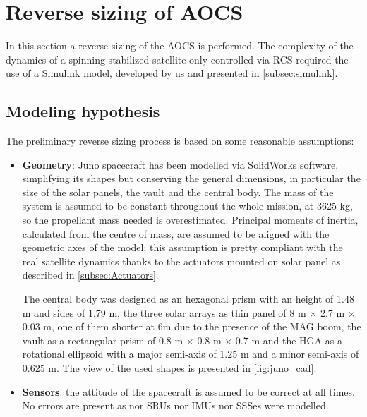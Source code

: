 \section{Reverse sizing of AOCS}
\label{sec:AOCS_sizing}

In this section a reverse sizing of the AOCS is performed. The complexity of the dynamics of a spinning stabilized satellite only controlled via RCS required the use of a Simulink model, developed by us and presented in \autoref{subsec:simulink}.
\subsection{Modeling hypothesis}
\label{subsec:mod_hypo}
The preliminary reverse sizing process is based on some reasonable assumptions:

\begin{itemize}
    \item
    \begin{minipage}[t]{0.7\linewidth}
        \textbf{Geometry}: Juno spacecraft has been modelled via SolidWorks software, simplifying its shapes but conserving the general dimensions, in particular the size of the solar panels, the vault and the central body. The mass of the system is assumed to be constant throughout the whole mission, at 3625 kg, so the propellant mass needed is overestimated.
        Principal moments of inertia, calculated from the centre of mass, are assumed to be aligned with the geometric axes of the model: this assumption is pretty compliant with the real satellite dynamics thanks to the actuators mounted on solar panel as described in \autoref{subsec:Actuators}. 
       
        The central body was designed as an hexagonal prism with an height of 1.48 m and sides of 1.79 m, the three solar arrays as thin panel of 8 m $\times$ 2.7 m $\times$ 0.03 m, one of them shorter at 6m due to the presence of the MAG boom, the vault as a rectangular prism of 0.8 m $\times$ 0.8 m $\times$ 0.7 m and the HGA as a rotational ellipsoid with a major semi-axis of 1.25 m and a minor semi-axis of 0.625 m. 
        The view of the used shapes is presented in \autoref{fig:juno_cad}.
    \end{minipage}\hfill
    \begin{minipage}[t]{0.3\linewidth}
        \vspace*{-10mm}
    \end{minipage}
    \pagebreak
    \item \textbf{Sensors}: the attitude of the spacecraft is assumed to be correct at all times. No errors are present as nor SRUs nor IMUs nor SSSes were modelled. 
    

\end{itemize}
